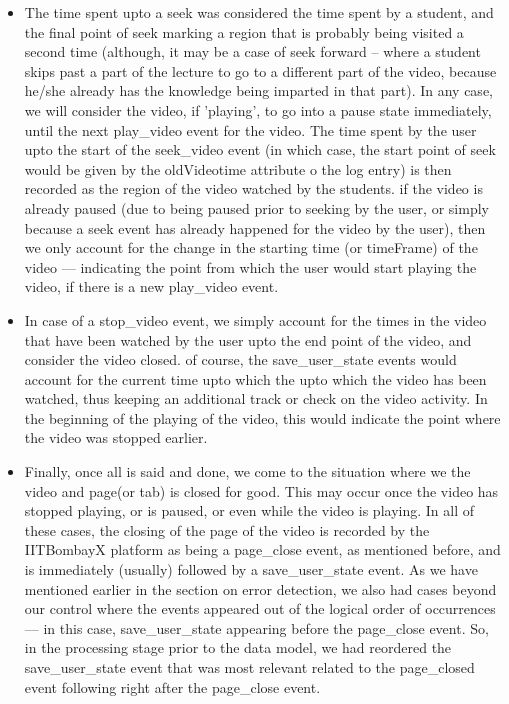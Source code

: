 \documentclass[16pt]{report}
\begin{document}
\begin{itemize}
\item The time spent upto a seek was considered the time spent by a student, and the final point of seek marking a region that is probably being visited a second time (although, it may be a case of seek forward -- where a student skips past a part of the lecture to go to a different part of the video, because he/she already has the knowledge being imparted in that part). In any case, we will consider the video, if 'playing', to go into a pause state immediately, until the next play\_video event for the video. The time spent by the user upto the start of the seek\_video event (in which case, the start point of seek would be given by the oldVideotime attribute o the log entry) is then recorded as the region of the video watched by the students. if the video is already paused (due to being paused prior to seeking by the user, or simply because a seek event has already happened for the video by the user), then we only account for the change in the starting time (or timeFrame) of the video --- indicating the point from which the user would start playing the video, if there is a new play\_video event.

\item In case of a stop\_video event, we simply account for the times in the video that have been watched by the user upto the end point of the video, and consider the video closed. of course, the save\_user\_state events would account for the current time upto which the upto which the video has been watched, thus keeping an additional track or check on the video activity. In the beginning of the playing of the video, this would indicate the point where the video was stopped earlier.

\item Finally, once all is said and done, we come to the situation where we the video and page(or tab) is closed for good. This may occur once the video has stopped playing, or is paused, or even while the video is playing. In all of these cases, the closing of the page of the video is recorded by the IITBombayX platform as being a page\_close event, as mentioned before, and is immediately (usually) followed by a save\_user\_state event. As we have mentioned earlier in the section on error detection, we also had cases beyond our control where the events appeared out of the logical order of occurrences --- in this case, save\_user\_state appearing before the page\_close event. So, in the processing stage prior to the data model, we had reordered the save\_user\_state event that was most relevant related to the page\_closed event following right after the page\_close event.


\end{itemize}
\end{document}
